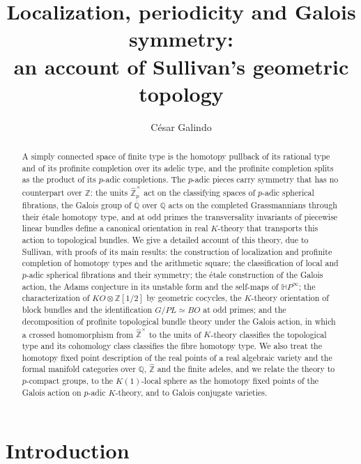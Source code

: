 \documentclass[11pt]{amsart}
\title[Localization, periodicity and Galois symmetry]{Localization, periodicity and Galois symmetry:\\ an account of Sullivan's geometric topology}
\author{C\'esar Galindo}
\theoremstyle{plain}
\theoremstyle{definition}
\numberwithin{equation}{section}
\newcommand{\Z}{\mathbb{Z}}
\newcommand{\Q}{\mathbb{Q}}
\newcommand{\Zhat}{\widehat{\mathbb{Z}}}
\newcommand{\Qbar}{\overline{\mathbb{Q}}}
\newcommand{\HP}{\mathbb{H}P}
\newcommand{\KO}{\mathit{KO}}
\newcommand{\units}{^{\times}}
\begin{document}
\begin{abstract}
A simply connected space of finite type is the homotopy pullback of its rational type and of its profinite completion over its adelic type, and the profinite completion splits as the product of its $p$-adic completions.
The $p$-adic pieces carry symmetry that has no counterpart over $\Z$: the units $\Zhat_p\units$ act on the classifying spaces of $p$-adic spherical fibrations, the Galois group of $\Qbar$ over $\Q$ acts on the completed Grassmannians through their \'etale homotopy type, and at odd primes the transversality invariants of piecewise linear bundles define a canonical orientation in real $K$-theory that transports this action to topological bundles.
We give a detailed account of this theory, due to Sullivan, with proofs of its main results: the construction of localization and profinite completion of homotopy types and the arithmetic square; the classification of local and $p$-adic spherical fibrations and their symmetry; the \'etale construction of the Galois action, the Adams conjecture in its unstable form and the self-maps of $\HP^\infty$; the characterization of $\KO\otimes\Z[1/2]$ by geometric cocycles, the $K$-theory orientation of block bundles and the identification $G/PL\simeq BO$ at odd primes; and the decomposition of profinite topological bundle theory under the Galois action, in which a crossed homomorphism from $\Zhat\units$ to the units of $K$-theory classifies the topological type and its cohomology class classifies the fibre homotopy type.
We also treat the homotopy fixed point description of the real points of a real algebraic variety and the formal manifold categories over $\Q$, $\Zhat$ and the finite adeles, and we relate the theory to $p$-compact groups, to the $K(1)$-local sphere as the homotopy fixed points of the Galois action on $p$-adic $K$-theory, and to Galois conjugate varieties.
\end{abstract}

\maketitle

\setcounter{tocdepth}{1}
\tableofcontents

\section*{Introduction}
\end{document}
